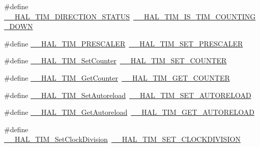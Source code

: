 \begin{DoxyCompactItemize}
\#define \hyperlink{group___h_a_l___t_i_m___aliased___macros_ga76886ef4a5712e8627ea09ff564cdff2}{\+\_\+\+\_\+\+H\+A\+L\+\_\+\+T\+I\+M\+\_\+\+D\+I\+R\+E\+C\+T\+I\+O\+N\+\_\+\+S\+T\+A\+T\+US}~\hyperlink{group___t_i_m___exported___macros_gac73f5e7669d92971830481e7298e98ba}{\+\_\+\+\_\+\+H\+A\+L\+\_\+\+T\+I\+M\+\_\+\+I\+S\+\_\+\+T\+I\+M\+\_\+\+C\+O\+U\+N\+T\+I\+N\+G\+\_\+\+D\+O\+WN}
\item 
\#define \hyperlink{group___h_a_l___t_i_m___aliased___macros_ga64fdbe2a68fc8459071ee0dcb9096e34}{\+\_\+\+\_\+\+H\+A\+L\+\_\+\+T\+I\+M\+\_\+\+P\+R\+E\+S\+C\+A\+L\+ER}~\hyperlink{group___t_i_m___exported___macros_gafdc5a06eab07e0c24e729fd492bdb27c}{\+\_\+\+\_\+\+H\+A\+L\+\_\+\+T\+I\+M\+\_\+\+S\+E\+T\+\_\+\+P\+R\+E\+S\+C\+A\+L\+ER}
\item 
\#define \hyperlink{group___h_a_l___t_i_m___aliased___macros_ga23ef14334077dc01d9e6d8bfa6614260}{\+\_\+\+\_\+\+H\+A\+L\+\_\+\+T\+I\+M\+\_\+\+Set\+Counter}~\hyperlink{group___t_i_m___exported___macros_ga9746ac75e4cd25cec1a9ebac8cb82b97}{\+\_\+\+\_\+\+H\+A\+L\+\_\+\+T\+I\+M\+\_\+\+S\+E\+T\+\_\+\+C\+O\+U\+N\+T\+ER}
\item 
\#define \hyperlink{group___h_a_l___t_i_m___aliased___macros_ga074ff6af2efe776a0e76622bf8d4c85a}{\+\_\+\+\_\+\+H\+A\+L\+\_\+\+T\+I\+M\+\_\+\+Get\+Counter}~\hyperlink{group___t_i_m___exported___macros_gaf1af08014b9d06efbbb091d58d47c8ba}{\+\_\+\+\_\+\+H\+A\+L\+\_\+\+T\+I\+M\+\_\+\+G\+E\+T\+\_\+\+C\+O\+U\+N\+T\+ER}
\item 
\#define \hyperlink{group___h_a_l___t_i_m___aliased___macros_ga8857297381807be432e6b6eb98fdb591}{\+\_\+\+\_\+\+H\+A\+L\+\_\+\+T\+I\+M\+\_\+\+Set\+Autoreload}~\hyperlink{group___t_i_m___exported___macros_ga1e6300cab1e34ecaaf490dc7d4812d69}{\+\_\+\+\_\+\+H\+A\+L\+\_\+\+T\+I\+M\+\_\+\+S\+E\+T\+\_\+\+A\+U\+T\+O\+R\+E\+L\+O\+AD}
\item 
\#define \hyperlink{group___h_a_l___t_i_m___aliased___macros_gae96afd3a280ee1faf2551537e6618ee4}{\+\_\+\+\_\+\+H\+A\+L\+\_\+\+T\+I\+M\+\_\+\+Get\+Autoreload}~\hyperlink{group___t_i_m___exported___macros_gaa7a5c7645695bad15bacd402513a028a}{\+\_\+\+\_\+\+H\+A\+L\+\_\+\+T\+I\+M\+\_\+\+G\+E\+T\+\_\+\+A\+U\+T\+O\+R\+E\+L\+O\+AD}
\item 
\#define \hyperlink{group___h_a_l___t_i_m___aliased___macros_ga8b8f3cf144c4058ec55e6e3659c6a68f}{\+\_\+\+\_\+\+H\+A\+L\+\_\+\+T\+I\+M\+\_\+\+Set\+Clock\+Division}~\hyperlink{group___t_i_m___exported___macros_ga8aa84d77c670890408092630f9b2bdc4}{\+\_\+\+\_\+\+H\+A\+L\+\_\+\+T\+I\+M\+\_\+\+S\+E\+T\+\_\+\+C\+L\+O\+C\+K\+D\+I\+V\+I\+S\+I\+ON}

\end{DoxyCompactItemize}

